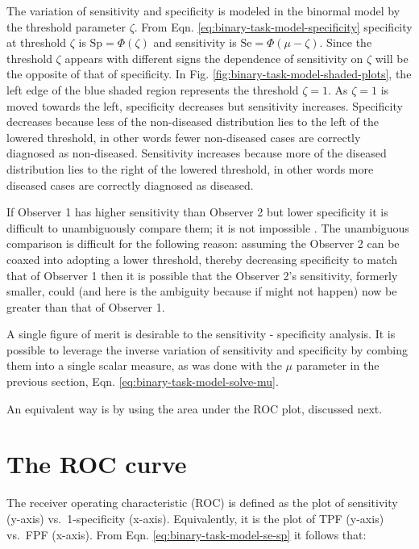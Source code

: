 \documentclass[
]{book}
\begin{document}
The variation of sensitivity and specificity is modeled in the binormal model by the threshold parameter \(\zeta\). From Eqn. \eqref{eq:binary-task-model-specificity} specificity at threshold \(\zeta\) is \(\text{Sp} = \Phi(\zeta)\) and sensitivity is \(\text{Se} = \Phi(\mu-\zeta)\). Since the threshold \(\zeta\) appears with different signs the dependence of sensitivity on \(\zeta\) will be the opposite of that of specificity. In Fig. \ref{fig:binary-task-model-shaded-plots}, the left edge of the blue shaded region represents the threshold \(\zeta = 1\). As \(\zeta = 1\) is moved towards the left, specificity decreases but sensitivity increases. Specificity decreases because less of the non-diseased distribution lies to the left of the lowered threshold, in other words fewer non-diseased cases are correctly diagnosed as non-diseased. Sensitivity increases because more of the diseased distribution lies to the right of the lowered threshold, in other words more diseased cases are correctly diagnosed as diseased.

If Observer 1 has higher sensitivity than Observer 2 but lower specificity it is difficult to unambiguously compare them; it is not impossible \citep{RN2637}. The unambiguous comparison is difficult for the following reason: assuming the Observer 2 can be coaxed into adopting a lower threshold, thereby decreasing specificity to match that of Observer 1 then it is possible that the Observer 2's sensitivity, formerly smaller, could (and here is the ambiguity because if might not happen) now be greater than that of Observer 1.

A single figure of merit is desirable to the sensitivity - specificity analysis. It is possible to leverage the inverse variation of sensitivity and specificity by combing them into a single scalar measure, as was done with the \(\mu\) parameter in the previous section, Eqn. \eqref{eq:binary-task-model-solve-mu}.

An equivalent way is by using the area under the ROC plot, discussed next.

\hypertarget{binary-task-model-roc-curve}{%
\section{The ROC curve}\label{binary-task-model-roc-curve}}

The receiver operating characteristic (ROC) is defined as the plot of sensitivity (y-axis) vs.~1-specificity (x-axis). Equivalently, it is the plot of TPF (y-axis) vs.~FPF (x-axis). From Eqn. \eqref{eq:binary-task-model-se-sp} it follows that:
\end{document}
